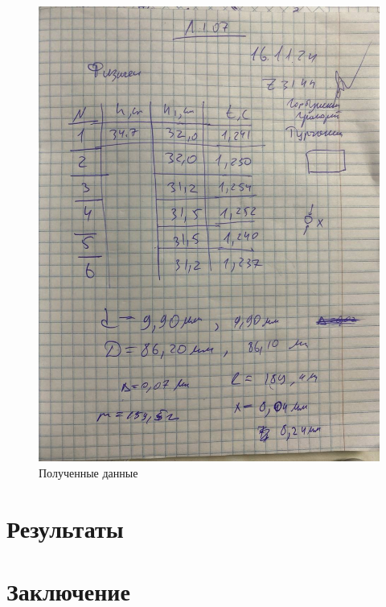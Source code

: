 \documentclass[a4paper]{article}
\begin{document}
\begin{figure}[H]
\centering
\includegraphics[scale=0.2]{3.png}
\caption{Полученные данные}
\end{figure}


\section{\textbf{Результаты}}




\section{\textbf{Заключение}}
\end{document}
